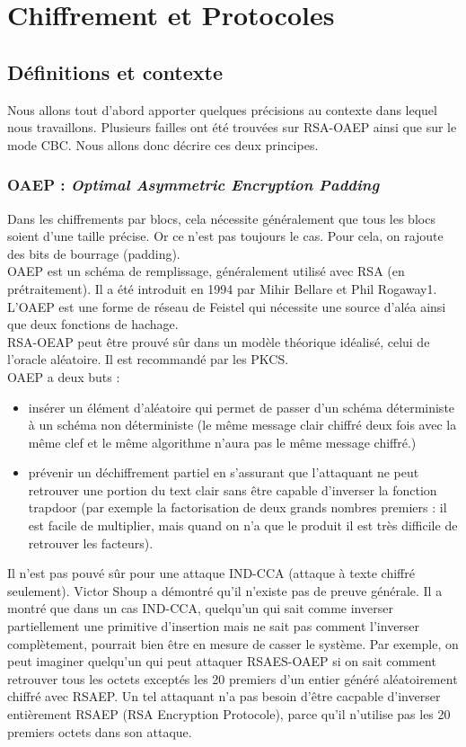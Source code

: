 \chapter{Chiffrement et Protocoles}

\section{Définitions et contexte}

Nous allons tout d'abord apporter quelques précisions au contexte dans lequel nous travaillons. Plusieurs failles ont été trouvées sur RSA-OAEP ainsi que sur le mode CBC. Nous allons donc décrire ces deux principes.
\subsection{OAEP : \textit{Optimal Asymmetric Encryption Padding}}
Dans les chiffrements par blocs, cela nécessite généralement que tous les blocs soient d'une taille précise. Or ce n'est pas toujours le cas. Pour cela, on rajoute des bits de bourrage (padding).\\
OAEP est un schéma de remplissage, généralement utilisé avec RSA (en prétraitement). Il a été introduit en 1994 par Mihir Bellare et Phil Rogaway1. L'OAEP est une forme de réseau de Feistel qui nécessite une source d'aléa ainsi que deux fonctions de hachage.\\
RSA-OEAP peut être prouvé sûr dans un modèle théorique idéalisé, celui de l'oracle aléatoire. Il est recommandé par les PKCS.\\
OAEP a deux buts :
\begin{itemize}
\item insérer un élément d'aléatoire qui permet de passer d'un schéma déterministe à un schéma non déterministe (le même message clair chiffré deux fois avec la même clef et le même algorithme n'aura pas le même message chiffré.)
\item prévenir un déchiffrement partiel en s'assurant que l'attaquant ne peut retrouver une portion du text clair sans être capable d'inverser la fonction trapdoor (par exemple la factorisation de deux grands nombres premiers : il est facile de multiplier, mais quand on n'a que le produit il est très difficile de retrouver les facteurs).\\
\end{itemize}
Il n'est pas pouvé sûr pour une attaque IND-CCA (attaque à texte chiffré seulement). Victor Shoup a démontré qu'il n'existe pas de preuve générale.
Il a montré que dans un cas IND-CCA, quelqu'un qui sait comme inverser partiellement une primitive d'insertion mais ne sait pas comment l'inverser complètement, pourrait bien être en mesure de casser le système. Par exemple, on peut imaginer quelqu'un qui peut attaquer RSAES-OAEP si on sait comment retrouver tous les octets exceptés les 20 premiers d'un entier généré aléatoirement chiffré avec RSAEP. Un tel attaquant n'a pas besoin d'être cacpable d'inverser entièrement RSAEP (RSA Encryption Protocole), parce qu'il n'utilise pas les 20 premiers octets dans son attaque.

